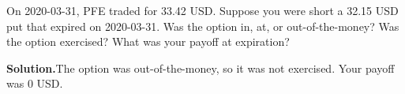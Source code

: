 \noindent On 2020-03-31, PFE traded for 33.42 USD. Suppose you were short a 32.15 USD put that expired on 2020-03-31. Was the option in, at, or out-of-the-money? Was the option exercised? What was your payoff at expiration?

\vspace{9pt} 

\textbf{Solution.}The option was out-of-the-money, so it was not exercised. Your payoff was 0 USD.